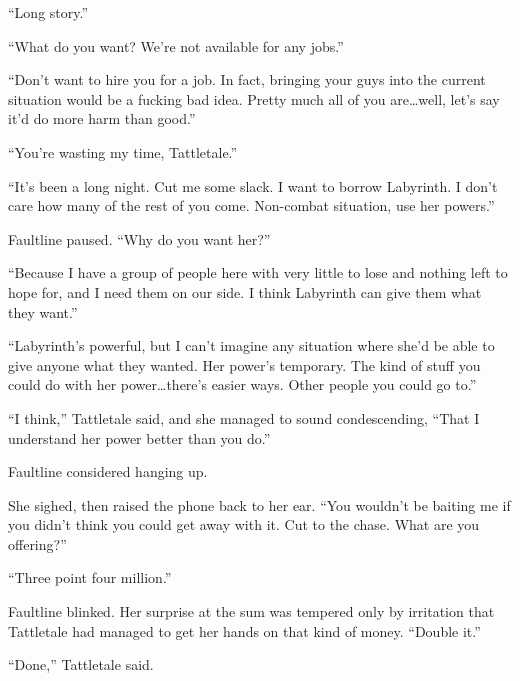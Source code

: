 ``Long story.''



``What do you want?  We're not available for any jobs.''



``Don't want to hire you for a job.  In fact, bringing your guys into the current situation would be a fucking bad idea.  Pretty much all of you are\ldots well, let's say it'd do more harm than good.''



``You're wasting my time, Tattletale.''



``It's been a long night.  Cut me some slack.  I want to borrow Labyrinth.  I don't care how many of the rest of you come.  Non-combat situation, use her powers.''



Faultline paused.  ``Why do you want her?''



``Because I have a group of people here with very little to lose and nothing left to hope for, and I need them on our side.  I think Labyrinth can give them what they want.''



``Labyrinth's powerful, but I can't imagine any situation where she'd be able to give anyone what they wanted.  Her power's temporary.  The kind of stuff you could do with her power\ldots there's easier ways.  Other people you could go to.''



``I think,'' Tattletale said, and she managed to sound condescending, ``That I understand her power better than you do.''



Faultline considered hanging up.



She sighed, then raised the phone back to her ear.  ``You wouldn't be baiting me if you didn't think you could get away with it.  Cut to the chase.  What are you offering?''



``Three point four million.''



Faultline blinked.  Her surprise at the sum was tempered only by irritation that Tattletale had managed to get her hands on that kind of money.  ``Double it.''



``Done,'' Tattletale said.



